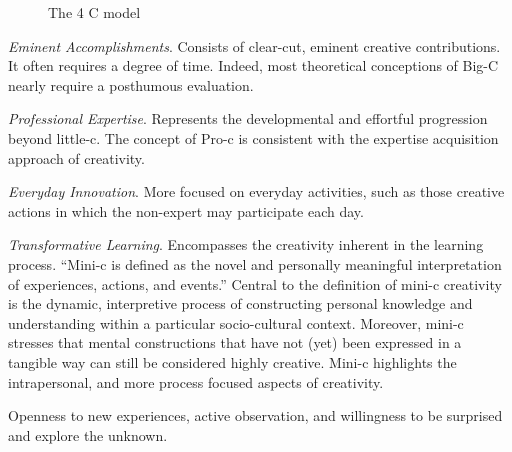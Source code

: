 \begin{figure}[!htbp]
  \centering
\caption[The 4 C model]{The 4 C model}
\label{fig:4C}
\end{figure}

\begin{description}[leftmargin=1.9cm]
  \item [Big-C] \textit{Eminent Accomplishments}. Consists of clear-cut, eminent creative contributions. It often requires a degree of time. Indeed, most theoretical conceptions of Big-C nearly require a posthumous evaluation.
  \item [Pro-c] \textit{Professional Expertise}. Represents the developmental and effortful progression beyond little-c. The concept of Pro-c is consistent with the expertise acquisition approach of creativity.
  \item [Little-c] \textit{Everyday Innovation}. More focused on everyday activities, such as those creative actions in which the non-expert may participate each day.
  \item [Mini-c] \textit{Transformative Learning}. Encompasses the creativity inherent in the learning process. ``Mini-c is defined as the novel and personally meaningful interpretation of experiences, actions, and events.'' \autocite{Beghetto2007} Central to the definition of mini-c creativity is the dynamic, interpretive process of constructing personal knowledge and understanding within a particular socio-cultural context. Moreover, mini-c stresses that mental constructions that have not (yet) been expressed in a tangible way can still be considered highly creative. Mini-c highlights the intrapersonal, and more process focused aspects of creativity.
  \item [All 4 C's] Openness to new experiences, active observation, and willingness to be surprised and explore the unknown.
\end{description}


